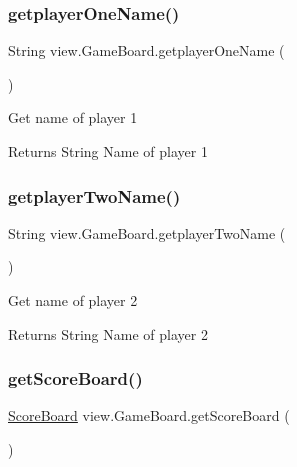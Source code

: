 \subsubsection{\texorpdfstring{getplayerOneName()}{getplayerOneName()}}
{\footnotesize\ttfamily String view.\+Game\+Board.\+getplayer\+One\+Name (\begin{DoxyParamCaption}{ }\end{DoxyParamCaption})\hspace{0.3cm}{\ttfamily [inline]}}

Get name of player 1 \begin{DoxyReturn}{Returns}
String Name of player 1 
\end{DoxyReturn}
\mbox{\label{classview_1_1_game_board_a4a45667a125320d690dcbda231c70db5}} 
\subsubsection{\texorpdfstring{getplayerTwoName()}{getplayerTwoName()}}
{\footnotesize\ttfamily String view.\+Game\+Board.\+getplayer\+Two\+Name (\begin{DoxyParamCaption}{ }\end{DoxyParamCaption})\hspace{0.3cm}{\ttfamily [inline]}}

Get name of player 2 \begin{DoxyReturn}{Returns}
String Name of player 2 
\end{DoxyReturn}
\mbox{\label{classview_1_1_game_board_ac720420b95f412df2dfc9ca2de0a2e0a}} 
\subsubsection{\texorpdfstring{getScoreBoard()}{getScoreBoard()}}
{\footnotesize\ttfamily \mbox{\hyperlink{classview_1_1_score_board}{Score\+Board}} view.\+Game\+Board.\+get\+Score\+Board (\begin{DoxyParamCaption}{ }\end{DoxyParamCaption})\hspace{0.3cm}{\ttfamily [inline]}}

